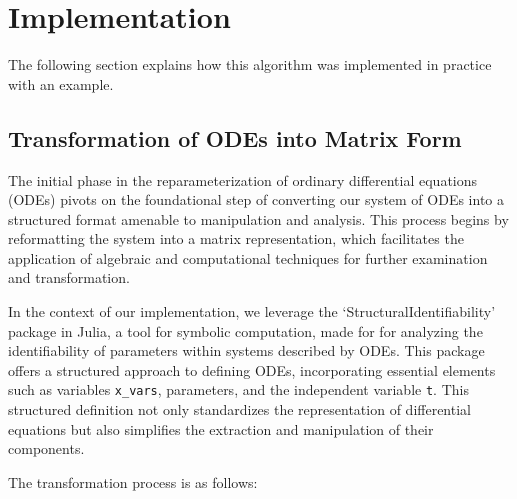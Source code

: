\documentclass[oneside, a4paper, onecolumn, 11pt]{article}
\begin{document}
\newpage

\section{Implementation}

The following section explains how this algorithm was implemented in practice with an example.

\subsection{Transformation of ODEs into Matrix Form}

The initial phase in the reparameterization of ordinary differential equations (ODEs) pivots on the foundational step of converting our system of ODEs into a structured format amenable to manipulation and analysis. This process begins by reformatting the system into a matrix representation, which facilitates the application of algebraic and computational techniques for further examination and transformation.

In the context of our implementation, we leverage the `StructuralIdentifiability' \cite{structidjl} package in Julia, a tool for symbolic computation, made for for analyzing the identifiability of parameters within systems described by ODEs. This package offers a structured approach to defining ODEs, incorporating essential elements such as variables \texttt{x\_vars}, parameters, and the independent variable \texttt{t}. This structured definition not only standardizes the representation of differential equations but also simplifies the extraction and manipulation of their components.

The transformation process is as follows:
\end{document}
